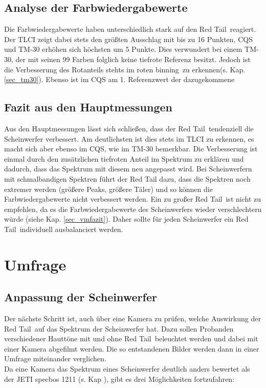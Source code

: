 \section{Analyse der Farbwiedergabewerte}
\label{sec_analfww}
Die Farbwiedergabewerte haben unterschiedlich stark auf den \glqq Red Tail\grqq\ reagiert. Der TLCI zeigt dabei stets den größten Ausschlag mit bis zu 16 Punkten, CQS und TM-30 erhöhen sich höchsten um 5 Punkte. Dies verwundert bei einem TM-30, der mit seinen 99 Farben folglich keine tiefrote Referenz besitzt. Jedoch ist die Verbesserung des Rotanteils stehts im roten \glqq binning\grqq\ zu erkennen(s. Kap. \ref{sec_tm30}). Ebenso ist im CQS am 1. Referenzwert der dazugekommene  


\section{Fazit aus den Hauptmessungen}
\label{sec_fazithm}
Aus den Hauptmessungen lässt sich schließen, dass der \glqq Red Tail\grqq\ tendenziell die Scheinwerfer verbessert. Am deutlichsten ist dies stets im TLCI zu erkennen, es macht sich aber ebenso im CQS, wie im TM-30 bemerkbar. Die Verbesserung ist einmal durch den zusätzlichen tiefroten Anteil im Spektrum zu erklären und dadurch, dass das Spektrum mit diesem neu angepasst wird. Bei Scheinwerfern mit schmalbandigen Spektren führt der Red Tail dazu, dass die Spektren noch extremer werden (größere Peaks, größere Täler) und so können die Farbwiedergabewerte nicht verbessert werden. Ein zu großer \glqq Red Tail\grqq\ ist nicht zu empfehlen, da es die Farbwiedergabewerte des Scheinwerfers wieder verschlechtern würde (siehe Kap. \ref{sec_vmfazit}). Daher sollte für jeden Scheinwerfer ein \glqq Red Tail\grqq\ individuell ausbalanciert werden.




\chapter{Umfrage}

\section{Anpassung der Scheinwerfer}
\label{sec_anpassunglampen}
Der nächste Schritt ist, auch über eine Kamera zu prüfen, welche Auswirkung der \glqq Red Tail\grqq\ auf das Spektrum der Scheinwerfer hat. Dazu sollen Probanden verschiedener Hauttöne mit und ohne \glqq Red Tail\grqq\ beleuchtet werden und dabei mit einer Kamera abgefilmt werden. Die so entstandenen Bilder werden dann in einer Umfrage miteinander verglichen.\\
Da eine Kamera das Spektrum eines Scheinwerfer deutlich anders bewertet als der JETI specbos 1211 (s. Kap ), gibt es drei Möglichkeiten fortzufahren:

